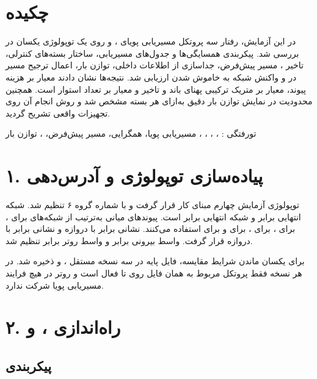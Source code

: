 \section{چکیده}

در این آزمایش، رفتار سه پروتکل مسیریابی پویای ،  و
 روی یک توپولوژی یکسان در  بررسی شد.
پیکربندی همسایگی‌ها و جدول‌های مسیریابی، ساختار بسته‌های کنترلی، تاخیر
، مسیر پیش‌فرض، جداسازی  از اطلاعات داخلی، توازن بار،
اعمال ترجیح مسیر در  و واکنش شبکه به خاموش شدن  ارزیابی شد.
نتیجه‌ها نشان دادند معیار  بر هزینه پیوند، معیار  بر متریک
ترکیبی پهنای باند و تاخیر و معیار  بر تعداد  استوار است.
همچنین محدودیت  در نمایش توازن بار دقیق به‌ازای هر
بسته مشخص شد و روش انجام آن روی تجهیزات واقعی تشریح گردید.

‌تورفتگی :
، ، ، ، مسیریابی پویا،
همگرایی، مسیر پیش‌فرض، ، توازن بار

\section{۱. پیاده‌سازی توپولوژی و آدرس‌دهی}

توپولوژی آزمایش چهارم مبنای کار قرار گرفت و با شماره گروه ۶ تنظیم شد.
شبکه انتهایی  برابر  و شبکه انتهایی 
برابر  است. پیوندهای میانی به‌ترتیب از شبکه‌های
 برای ،  برای ،
 برای ،  برای
 و  برای  استفاده می‌کنند.
نشانی  برابر  با دروازه  و نشانی
 برابر  با دروازه  قرار گرفت.
واسط بیرونی  برابر  و واسط روتر
 برابر  تنظیم شد.

برای یکسان ماندن شرایط مقایسه، فایل پایه در سه نسخه مستقل
،  و  ذخیره شد. در هر نسخه فقط
پروتکل مربوط به همان فایل روی  تا  فعال است و روتر
 در هیچ فرایند مسیریابی پویا شرکت ندارد.

\section{۲. راه‌اندازی ،  و }

\subsection{پیکربندی }

